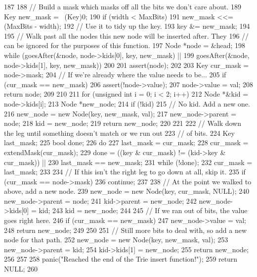 \begin{DoxyCode}
187     {
188         // Build a mask which masks off all the bits we don't care about.
189         Key new_mask = ~(Key)0;
190         if (width < MaxBits)
191             new_mask <<= (MaxBits - width);
192         // Use it to tidy up the key.
193         key &= new_mask;
194 
195         // Walk past all the nodes this new node will be inserted after. They
196         // can be ignored for the purposes of this function.
197         Node *node = &head;
198         while (goesAfter(&node, node->kids[0], key, new_mask) ||
199                goesAfter(&node, node->kids[1], key, new_mask))
200         {}
201         assert(node);
202 
203         Key cur_mask = node->mask;
204         // If we're already where the value needs to be...
205         if (cur_mask == new_mask) {
206             assert(!node->value);
207             node->value = val;
208             return node;
209         }
210 
211         for (unsigned int i = 0; i < 2; i++) {
212             Node *&kid = node->kids[i];
213             Node *new_node;
214             if (!kid) {
215                 // No kid. Add a new one.
216                 new_node = new Node(key, new_mask, val);
217                 new_node->parent = node;
218                 kid = new_node;
219                 return new_node;
220             }
221 
222             // Walk down the leg until something doesn't match or we run out
223             // of bits.
224             Key last_mask;
225             bool done;
226             do {
227                 last_mask = cur_mask;
228                 cur_mask = extendMask(cur_mask);
229                 done = ((key & cur_mask) != (kid->key & cur_mask)) ||
230                     last_mask == new_mask;
231             } while (!done);
232             cur_mask = last_mask;
233 
234             // If this isn't the right leg to go down at all, skip it.
235             if (cur_mask == node->mask)
236                 continue;
237 
238             // At the point we walked to above, add a new node.
239             new_node = new Node(key, cur_mask, NULL);
240             new_node->parent = node;
241             kid->parent = new_node;
242             new_node->kids[0] = kid;
243             kid = new_node;
244 
245             // If we ran out of bits, the value goes right here.
246             if (cur_mask == new_mask) {
247                 new_node->value = val;
248                 return new_node;
249             }
250 
251             // Still more bits to deal with, so add a new node for that path.
252             new_node = new Node(key, new_mask, val);
253             new_node->parent = kid;
254             kid->kids[1] = new_node;
255             return new_node;
256         }
257 
258         panic("Reached the end of the Trie insert function!\n");
259         return NULL;
260     }
\end{DoxyCode}
